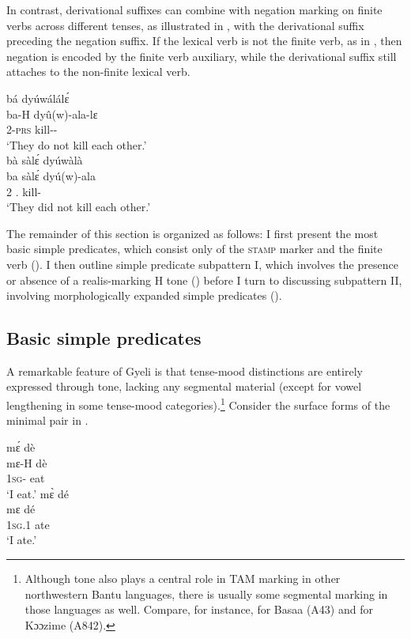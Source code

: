 \noindent In contrast,  derivational suffixes can combine with negation marking on finite verbs across different tenses, as illustrated in , with the derivational suffix preceding the negation suffix. If the lexical verb is not the finite verb, as in , then negation is encoded by the finite verb auxiliary, while the derivational suffix still attaches to the non-finite lexical verb. 

\ea\label{VSuff4}
\ea  \label{VSuff4a}
  \glll  bá dyúwálálɛ́  \\
          ba-H dyû(w)-ala-lɛ \\
            2-\textsc{prs} kill-{\RECIP}-{\NEG} \\
    \trans `They do not kill each other.' \\
\ex\label{VSuff4b}
  \glll  bà sàlɛ́ dyúwàlà \\
          ba sàlɛ́ dyú(w)-ala\\
            2 {\NEG}.{\PST} kill-{\RECIP} \\
    \trans `They did not kill each other.' \\
\z
\z

The remainder of this section is organized as follows: I first present the most basic simple predicates, which consist only of the \textsc{stamp} marker and the finite verb (). I then outline simple predicate subpattern I,  which involves the presence or absence of a realis-marking H tone () before I turn to discussing subpattern II, involving morphologically expanded simple predicates (). 






\subsection{Basic simple predicates}
\label{sec:GramTM}

A remarkable feature of Gyeli is that tense-mood distinctions are entirely expressed through tone, lacking any segmental material (except for vowel lengthening in some tense-mood categories).\footnote{Although tone also plays a central role in TAM marking in other northwestern Bantu languages, there is usually some segmental marking in those languages as well. Compare, for instance, \citet{makasso2012} for Basaa (A43) and \citet{beavon91} for Kɔɔzime (A842).}
Consider the surface forms of the minimal pair in .

\ea\label{Tmin}
\ea  \label{Tmin1}
  \glll  mɛ́ dè \\
  mɛ-H dè \\
            1\textsc{sg}-{\PRS} eat\\
    \trans `I eat.'
\ex\label{Tmin2}
 \glll   mɛ̀ dé \\
 mɛ dé \\
         1\textsc{sg}.{\PST}1 ate\\
    \trans `I ate.'
\z
\z

